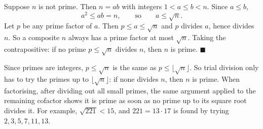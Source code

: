 Suppose $n$ is not prime. Then $n=ab$ with integers $1<a\le b<n$. Since $a\le b$,
\[
a^2\le ab=n,\qquad\text{so}\qquad a\le\sqrt{n} .
\]
Let $p$ be any prime factor of $a$. Then $p\le a\le\sqrt{n}$ and $p$ divides $a$, hence divides $n$. So a composite $n$ always has a prime factor at most $\sqrt{n}$. Taking the contrapositive: if no prime $p\le\sqrt{n}$ divides $n$, then $n$ is prime. $\blacksquare$

Since primes are integers, $p\le\sqrt{n}$ is the same as $p\le\lfloor\sqrt{n}\rfloor$. So trial division only has to try the primes up to $\lfloor\sqrt{n}\rfloor$: if none divides $n$, then $n$ is prime. When factorising, after dividing out all small primes, the same argument applied to the remaining cofactor shows it is prime as soon as no prime up to its square root divides it. For example, $\sqrt{221}<15$, and $221=13\cdot17$ is found by trying $2,3,5,7,11,13$.
